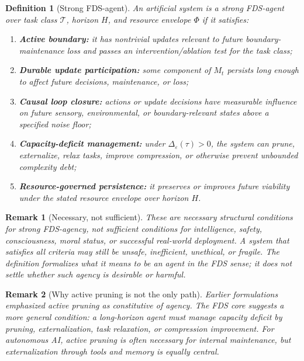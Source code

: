 \documentclass[10pt,a4paper,twocolumn,aps,prl]{revtex4-2}
\newtheorem{definition}{Definition}
\newtheorem{remark}{Remark}
\begin{document}
\begin{definition}[Strong FDS-agent]
An artificial system is a strong FDS-agent over task class $\mathcal{T}$, horizon $H$, and resource envelope $\Phi$ if it satisfies:
\begin{enumerate}[leftmargin=2em]
    \item \textbf{Active boundary:} it has nontrivial updates relevant to future boundary-maintenance loss and passes an intervention/ablation test for the task class;
    \item \textbf{Durable update participation:} some component of $M_t$ persists long enough to affect future decisions, maintenance, or loss;
    \item \textbf{Causal loop closure:} actions or update decisions have measurable influence on future sensory, environmental, or boundary-relevant states above a specified noise floor;
    \item \textbf{Capacity-deficit management:} under $\Delta_{\varepsilon}(\tau)>0$, the system can prune, externalize, relax tasks, improve compression, or otherwise prevent unbounded complexity debt;
    \item \textbf{Resource-governed persistence:} it preserves or improves future viability under the stated resource envelope over horizon $H$.
\end{enumerate}
\end{definition}

\begin{remark}[Necessary, not sufficient]
These are necessary structural conditions for strong FDS-agency, not sufficient conditions for intelligence, safety, consciousness, moral status, or successful real-world deployment. A system that satisfies all criteria may still be unsafe, inefficient, unethical, or fragile. The definition formalizes what it means to be an agent in the FDS sense; it does not settle whether such agency is desirable or harmful.
\end{remark}

\begin{remark}[Why active pruning is not the only path]
Earlier formulations emphasized active pruning as constitutive of agency. The FDS core suggests a more general condition: a long-horizon agent must manage capacity deficit by pruning, externalization, task relaxation, or compression improvement. For autonomous AI, active pruning is often necessary for internal maintenance, but externalization through tools and memory is equally central.
\end{remark}
\end{document}
